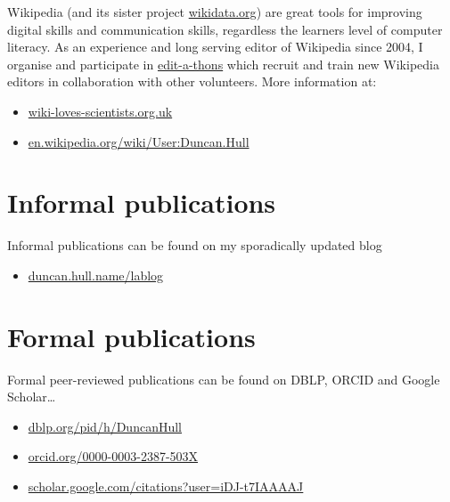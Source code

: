 \documentclass[12pt,]{book}
\providecommand{\tightlist}{%
  \setlength{\itemsep}{0pt}\setlength{\parskip}{0pt}}
\begin{document}
Wikipedia (and its sister project \href{https://www.wikidata.org}{wikidata.org}) are great tools for improving digital skills and communication skills, regardless the learners level of computer literacy. As an experience and long serving editor of Wikipedia since 2004, I organise and participate in \href{https://en.wikipedia.org/wiki/Edit-a-thon}{edit-a-thons} which recruit and train new Wikipedia editors in collaboration with other volunteers. More information at:

\begin{itemize}
\tightlist
\item
  \href{https://wiki-loves-scientists.org.uk/}{wiki-loves-scientists.org.uk}
\item
  \href{https://en.wikipedia.org/wiki/User:Duncan.Hull}{en.wikipedia.org/wiki/User:Duncan.Hull}
\end{itemize}

\hypertarget{informal-publications}{%
\section{Informal publications}\label{informal-publications}}

Informal publications can be found on my sporadically updated blog

\begin{itemize}
\tightlist
\item
  \href{https://duncan.hull.name/lablog/}{duncan.hull.name/lablog}
\end{itemize}

\hypertarget{formal-publications}{%
\section{Formal publications}\label{formal-publications}}

Formal peer-reviewed publications can be found on DBLP, ORCID and Google Scholar\ldots{}

\begin{itemize}
\tightlist
\item
  \href{https://dblp.org/pid/h/DuncanHull}{dblp.org/pid/h/DuncanHull}
\item
  \href{https://orcid.org/0000-0003-2387-503X}{orcid.org/0000-0003-2387-503X}
\item
  \href{https://scholar.google.com/citations?user=iDJ-t7IAAAAJ}{scholar.google.com/citations?user=iDJ-t7IAAAAJ}
\end{itemize}
\end{document}

